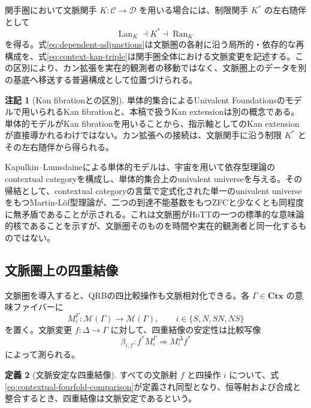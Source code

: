\documentclass[a4paper,11pt]{ltjsarticle}
\theoremstyle{definition}
\newtheorem{definition}{定義}[section]
\newtheorem{remark}[definition]{注記}
\theoremstyle{plain}
\newcommand{\Obj}{\mathcal M}
\newcommand{\Lan}{\operatorname{Lan}}
\newcommand{\Ran}{\operatorname{Ran}}
\newcommand{\Ctx}{\mathbf{Ctx}}
\begin{document}
関手圏において文脈関手 $K:\mathcal C\to\mathcal D$ を用いる場合には、制限関手 $K^*$ の左右随伴として
\begin{equation}
 \Lan_K\dashv K^*\dashv\Ran_K
 \label{eq:context-kan-triple}
\end{equation}
を得る。式\eqref{eq:dependent-adjunctions}は文脈圏の各射に沿う局所的・依存的な再構成を、式\eqref{eq:context-kan-triple}は関手圏全体における文脈変更を記述する。この区別により、カン拡張を実在的観測者の移動ではなく、文脈圏上のデータを別の基底へ移送する普遍構成として位置づけられる。

\begin{remark}[Kan fibrationとの区別]
単体的集合によるUnivalent Foundationsのモデルで用いられるKan fibrationと、本稿で扱うKan extensionは別の概念である。単体的モデルがKan fibrationを用いることから、指示軸としてのKan extensionが直接導かれるわけではない。カン拡張への接続は、文脈関手に沿う制限 $K^*$ とその左右随伴から得られる。
\end{remark}

Kapulkin--Lumsdaineによる単体的モデルは、宇宙を用いて依存型理論のcontextual categoryを構成し、単体的集合上のunivalent universeを与える。その帰結として、contextual categoryの言葉で定式化された単一のunivalent universeをもつMartin-Löf型理論が、二つの到達不能基数をもつZFCと少なくとも同程度に無矛盾であることが示される\cite{KapulkinLumsdaine2021}。これは文脈圏がHoTTの一つの標準的な意味論的核であることを示すが、文脈圏そのものを時間や実在的観測者と同一化するものではない。

\subsection{文脈圏上の四重結像}

文脈圏を導入すると、QRBの四比較操作も文脈相対化できる。各 $\Gamma\in\Ctx$ の意味ファイバーに
\begin{equation}
 M_i^{\Gamma}:\Obj(\Gamma)\longrightarrow\Obj(\Gamma),
 \qquad
 i\in\{S,N,SN,NS\}
\end{equation}
を置く。文脈変更 $f:\Delta\to\Gamma$ に対して、四重結像の安定性は比較写像
\begin{equation}
 \beta_{i,f}:
 f^*M_i^{\Gamma}
 \Longrightarrow
 M_i^{\Delta}f^*
 \label{eq:contextual-fourfold-comparison}
\end{equation}
によって測られる。

\begin{definition}[文脈安定な四重結像]
すべての文脈射 $f$ と四操作 $i$ について、式\eqref{eq:contextual-fourfold-comparison}が定義され同型となり、恒等射および合成と整合するとき、四重結像は文脈安定であるという。
\end{definition}
\end{document}
